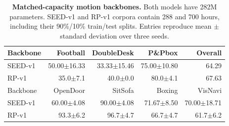 \begin{table}[t]\centering\small
\caption{\textbf{Matched-capacity motion backbones.} Both models have 282M parameters. SEED-v1 and RP-v1 corpora contain 288 and 700 hours, including their 90\%/10\% train/test splits. Entries reproduce mean $\pm$ standard deviation over three seeds.}
\label{tab:backbone}\setlength{\tabcolsep}{4pt}
\begin{tabular}{lrrrr}\toprule
Backbone & Football & DoubleDesk & P\&Pbox & Overall\\\midrule
SEED-v1 &50.00$\pm$16.33&33.33$\pm$15.46&75.00$\pm$10.80&64.29\\
RP-v1 &35.0$\pm$7.1&40.0$\pm$0.0&80.0$\pm$4.1&67.63\\\midrule
Backbone & OpenDoor & SitSofa & Boxing & VisNavi\\\midrule
SEED-v1 &60.00$\pm$4.08&90.00$\pm$4.08&71.67$\pm$8.50&70.00$\pm$18.71\\
RP-v1 &93.3$\pm$6.2&96.7$\pm$4.7&66.7$\pm$4.7&61.7$\pm$6.2\\\bottomrule
\end{tabular}\end{table}
